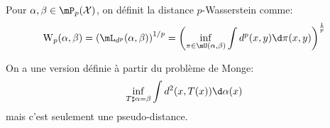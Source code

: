 \begin{definition}
	Pour $\alpha, \beta \in \mP_{p}(\X)$, on définit la distance $p$-Wasserstein comme:
	\begin{equation*}
		\Wass_{p}(\alpha, \beta) = \left(\mL_{d^{p}}(\alpha, \beta)\right)^{1 / p} = \left(\inf_{\pi \in \mU(\alpha, \beta)}\int d^{p}(x, y)\d \pi(x, y)\right)^{\frac{1}{p}}
	\end{equation*}
\end{definition}

\begin{remarque}
	On a une version définie à partir du problème de Monge:
	\begin{equation*}
		\inf_{T\sharp \alpha = \beta}\int d^{2}(x, T(x))\d \alpha(x)
	\end{equation*}
	mais c'est seulement une pseudo-distance.
\end{remarque}

